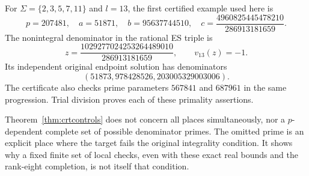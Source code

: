 For $\Sigma=\{2,3,5,7,11\}$ and $l=13$, the first certified example used here is
\[
 p=207481,\quad a=51871,\quad b=95637744510,
 \quad c=\frac{4960825445478210}{286913181659}.             \tag{IC35}
\]
The nonintegral denominator in the rational ES triple is
\[
 z=\frac{1029277024253264489010}{286913181659},\qquad v_{13}(z)=-1.
\]
Its independent original endpoint solution has denominators
\[
 (51873,978428526,203005329003006).
\]
The certificate also checks prime parameters $567841$ and $687961$ in the same
progression. Trial division proves each of these primality assertions.

Theorem~\ref{thm:crtcontrols} does not concern all places simultaneously, nor a
$p$-dependent complete set of possible denominator primes. The omitted prime is
an explicit place where the target fails the original integrality condition.
It shows why a fixed finite set of local checks, even with these exact real
bounds and the rank-eight completion, is not itself that condition.
